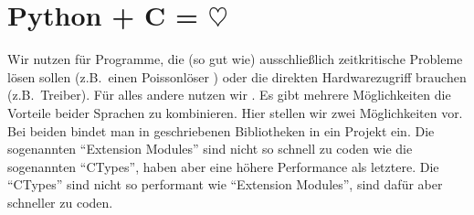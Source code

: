 \section{\texorpdfstring{Python + C = $\heartsuit$}{Python plus C gleich Liebe}}
\label{section:python_mit_c}
Wir nutzen \CC für Programme, die (so gut wie) ausschließlich zeitkritische Probleme lösen sollen (z.B.\ einen Poissonlöser \cite{joelixC}) oder die direkten Hardwarezugriff brauchen (z.B.\ Treiber).
Für alles andere nutzen wir \Python.
Es gibt mehrere Möglichkeiten die Vorteile beider Sprachen zu kombinieren.
Hier stellen wir zwei Möglichkeiten vor.
Bei beiden bindet man in \C geschriebenen Bibliotheken in ein \Python Projekt ein.
Die sogenannten ``Extension Modules'' sind nicht so schnell zu coden wie die sogenannten ``CTypes'', haben aber eine höhere Performance als letztere.
Die ``CTypes'' sind nicht so performant wie ``Extension Modules'', sind dafür aber schneller zu coden.




